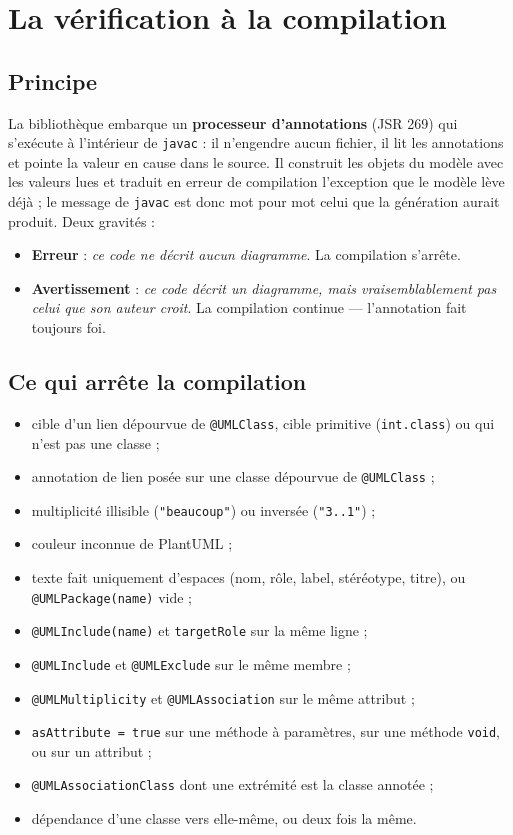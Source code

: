 \documentclass[12pt, a4paper]{article}
\begin{document}
\section{La vérification à la compilation}
\label{sec:verification}

\subsection{Principe}
La bibliothèque embarque un \textbf{processeur d'annotations} (JSR 269) qui s'exécute à l'intérieur de \texttt{javac} : il n'engendre aucun fichier, il lit les annotations et pointe la valeur en cause dans le source. Il construit les objets du modèle avec les valeurs lues et traduit en erreur de compilation l'exception que le modèle lève déjà ; le message de \texttt{javac} est donc mot pour mot celui que la génération aurait produit. Deux gravités :
\begin{itemize}
    \item \textbf{Erreur} : \textit{ce code ne décrit aucun diagramme}. La compilation s'arrête.
    \item \textbf{Avertissement} : \textit{ce code décrit un diagramme, mais vraisemblablement pas celui que son auteur croit}. La compilation continue --- l'annotation fait toujours foi.
\end{itemize}

\subsection{Ce qui arrête la compilation}
\begin{itemize}
    \item cible d'un lien dépourvue de \texttt{@UMLClass}, cible primitive (\texttt{int.class}) ou qui n'est pas une classe ;
    \item annotation de lien posée sur une classe dépourvue de \texttt{@UMLClass} ;
    \item multiplicité illisible (\texttt{"beaucoup"}) ou inversée (\texttt{"3..1"}) ;
    \item couleur inconnue de PlantUML ;
    \item texte fait uniquement d'espaces (nom, rôle, label, stéréotype, titre), ou \texttt{@UMLPackage(name)} vide ;
    \item \texttt{@UMLInclude(name)} et \texttt{targetRole} sur la même ligne ;
    \item \texttt{@UMLInclude} et \texttt{@UMLExclude} sur le même membre ;
    \item \texttt{@UMLMultiplicity} et \texttt{@UMLAssociation} sur le même attribut ;
    \item \texttt{asAttribute = true} sur une méthode à paramètres, sur une méthode \texttt{void}, ou sur un attribut ;
    \item \texttt{@UMLAssociationClass} dont une extrémité est la classe annotée ;
    \item dépendance d'une classe vers elle-même, ou deux fois la même.
\end{itemize}
\end{document}
